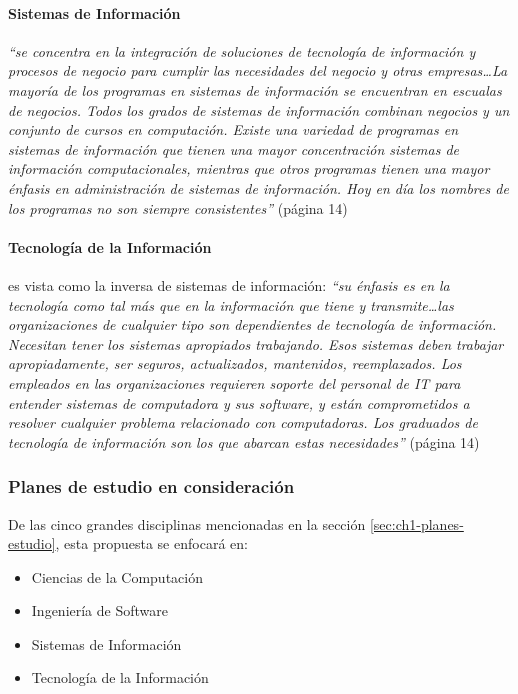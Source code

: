 \paragraph{Sistemas de Información} \emph{``se concentra en la integración de soluciones de tecnología de información y procesos de negocio para cumplir las necesidades del negocio y otras empresas\ldots La mayoría de los programas en sistemas de información se encuentran en escualas de negocios. Todos los grados de sistemas de información combinan negocios y un conjunto de cursos en computación. Existe una variedad de programas en sistemas de información que tienen una mayor concentración sistemas de información computacionales, mientras que otros programas tienen una mayor énfasis en administración de sistemas de información. Hoy en día los nombres de los programas no son siempre consistentes''} (página 14)

\paragraph{Tecnología de la Información} es vista como la inversa de sistemas de información: \emph{``su énfasis es en la tecnología como tal más que en la información que tiene y transmite\ldots las organizaciones de cualquier tipo son dependientes de tecnología de información. Necesitan tener los sistemas apropiados trabajando. Esos sistemas deben trabajar apropiadamente, ser seguros, actualizados, mantenidos, reemplazados. Los empleados en las organizaciones requieren soporte del personal de IT para entender sistemas de computadora y sus software, y están comprometidos a resolver cualquier problema relacionado con computadoras. Los graduados de tecnología de información son los que abarcan estas necesidades''} (página 14)

\subsubsection{Planes de estudio en consideración}
De las cinco grandes disciplinas mencionadas en la sección \ref{sec:ch1-planes-estudio}, esta propuesta se enfocará en:
\begin{itemize}
    \item Ciencias de la Computación
    \item Ingeniería de Software
    \item Sistemas de Información
    \item Tecnología de la Información
\end{itemize}

